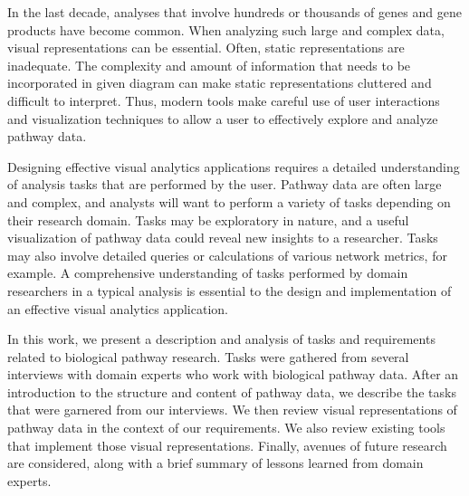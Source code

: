 In the last decade, analyses that involve hundreds or thousands of genes and gene products have become common.
When analyzing such large and complex data, visual representations can be essential.
Often, static representations are inadequate.
The complexity and amount of information that needs to be incorporated in given diagram can make static representations cluttered and difficult to interpret.
Thus, modern tools make careful use of user interactions and visualization techniques to allow a user to effectively explore and analyze pathway data.


Designing effective visual analytics applications requires a detailed understanding of analysis tasks that are performed by the user.
Pathway data are often large and complex, and analysts will want to perform a variety of tasks depending on their research domain.
Tasks may be exploratory in nature, and a useful visualization of pathway data could reveal new insights to a researcher.
Tasks may also involve detailed queries or calculations of various network metrics, for example.
A comprehensive understanding of tasks performed by domain researchers in a typical analysis is essential to the design and implementation of an effective visual analytics application.




In this work, we present a description and analysis of tasks and requirements related to biological pathway research.
Tasks were gathered from several interviews with domain experts who work with biological pathway data.
After an introduction to the structure and content of pathway data, we describe the tasks that were garnered from our interviews.
We then review visual representations of pathway data in the context of our requirements.
We also review existing tools that implement those visual representations.
Finally, avenues of future research are considered, along with a brief summary of lessons learned from domain experts.

